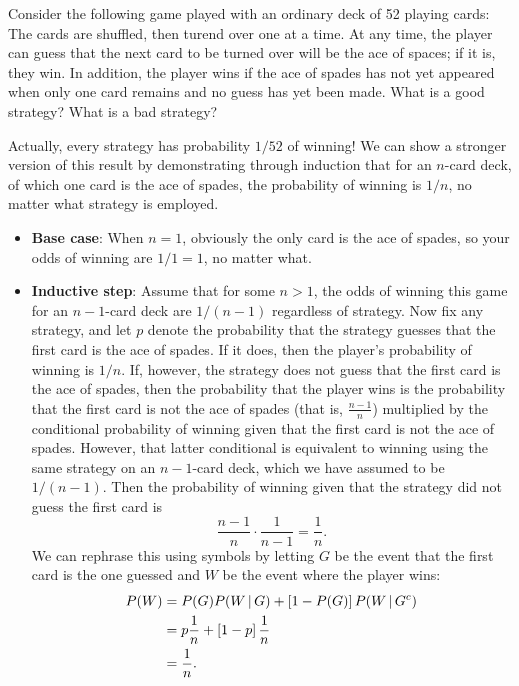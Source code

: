 \begin{changebar}
    \begin{example}
        Consider the following game played with an ordinary deck of 52 playing cards: The cards are shuffled, then turend over one at a time. At any time, the player can guess that the next card to be turned over will be the ace of spaces; if it is, they win. In addition, the player wins if the ace of spades has not yet appeared when only one card remains and no guess has yet been made. What is a good strategy? What is a bad strategy?
    \end{example}
    \begin{solution}
        Actually, every strategy has probability $1/52$ of winning! We can show a stronger version of this result by demonstrating through induction that for an $n$-card deck, of which one card is the ace of spades, the probability of winning is $1/n$, no matter what strategy is employed. \begin{itemize}
            \item \textbf{Base case}: When $n = 1$, obviously the only card is the ace of spades, so your odds of winning are $1/1 = 1$, no matter what.
            \item \textbf{Inductive step}: Assume that for some $n > 1$, the odds of winning this game for an $n-1$-card deck are $1/(n-1)$ regardless of strategy. Now fix any strategy, and let $p$ denote the probability that the strategy guesses that the first card is the ace of spades. If it does, then the player's probability of winning is $1/n$. If, however, the strategy does not guess that the first card is the ace of spades, then the probability that the player wins is the probability that the first card is not the ace of spades (that is, $\frac{n-1}{n}$) multiplied by the conditional probability of winning given that the first card is not the ace of spades. However, that latter conditional is equivalent to winning using the same strategy on an $n-1$-card deck, which we have assumed to be $1/(n-1)$. Then the probability of winning given that the strategy did not guess the first card is \[
                \frac{n-1}{n}\cdot\frac{1}{n-1} = \frac{1}{n}.    
            \] We can rephrase this using symbols by letting $G$ be the event that the first card is the one guessed and $W$ be the event where the player wins: \[
                \begin{aligned}
                    P(W) &= P(G)P(W \,\vert\, G) + \left[ 1 - P(G) \right]P(W \,\vert\, G^c) \\
                    &= p\frac{1}{n} + \left[ 1 - p \right]\frac{1}{n} \\
                    &= \frac{1}{n}.
                \end{aligned}    
            \]
        \end{itemize} 
    \end{solution}
\end{changebar}

